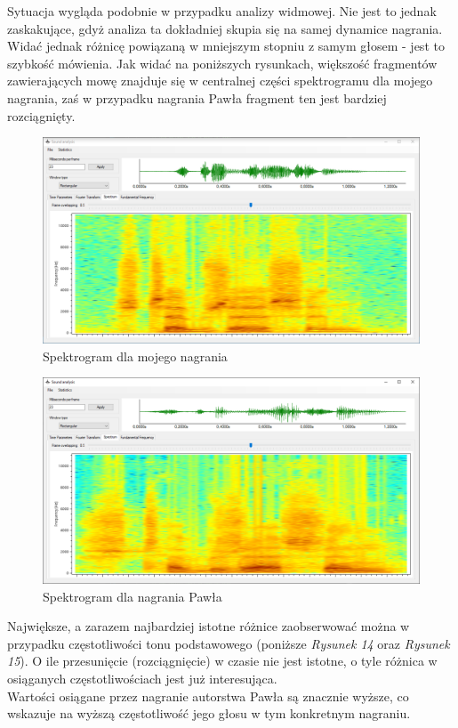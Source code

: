 \documentclass[a4paper]{article}
\begin{document}
Sytuacja wygląda podobnie w przypadku analizy widmowej. Nie jest to jednak zaskakujące, gdyż analiza ta dokładniej skupia się na samej dynamice nagrania.\\
Widać jednak różnicę powiązaną w mniejszym stopniu z samym głosem - jest to szybkość mówienia. Jak widać na poniższych rysunkach, większość fragmentów zawierających mowę znajduje się w centralnej części spektrogramu dla mojego nagrania, zaś w przypadku nagrania Pawła fragment ten jest bardziej rozciągnięty.
\begin{figure}[H]
  \centering
  \includegraphics[width=0.86\linewidth]{images/12spectrogramMy.png}
  \caption{Spektrogram dla mojego nagrania}
\end{figure}
\begin{figure}[H]
  \centering
  \includegraphics[width=0.86\linewidth]{images/13spectrogramBro.png}
  \caption{Spektrogram dla nagrania Pawła}
\end{figure}
Największe, a zarazem najbardziej istotne różnice zaobserwować można w przypadku częstotliwości tonu podstawowego (poniższe \textit{Rysunek 14} oraz \textit{Rysunek 15}). O ile przesunięcie (rozciągnięcie) w czasie nie jest istotne, o tyle różnica w osiąganych częstotliwościach jest już interesująca.\\
Wartości osiągane przez nagranie autorstwa Pawła są znacznie wyższe, co wskazuje na wyższą częstotliwość jego głosu w tym konkretnym nagraniu.\\
\end{document}
